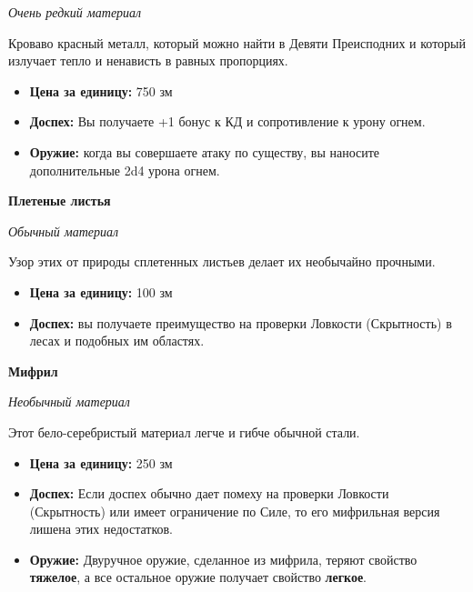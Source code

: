 \documentclass[a4paper, 9pt, twocolumn]{book}
\begin{document}
	\noindent \textit{Очень редкий материал}
	
	\smallskip
	
	\noindent Кроваво красный металл, который можно найти в Девяти Преисподних и который излучает тепло и ненависть в равных пропорциях.
	
	\begin{itemize}
		\item \textbf{Цена за единицу:} 750 зм
		
		\item \textbf{Доспех:} Вы получаете +1 бонус к КД и сопротивление к урону огнем.
		
		\item \textbf{Оружие:} когда вы совершаете атаку по существу, вы наносите дополнительные 2d4 урона огнем.
	\end{itemize}

	\noindent \textbf{Плетеные листья} %
	
	\noindent \textit{Обычный материал}
	
	\smallskip
	
	\noindent Узор этих от природы сплетенных листьев делает их необычайно прочными.
	
	\begin{itemize}
		\item \textbf{Цена за единицу:} 100 зм
		
		\item \textbf{Доспех:} вы получаете преимущество на проверки Ловкости (Скрытность) в лесах и подобных им областях.
	\end{itemize}

	\noindent \textbf{Мифрил}
	
	\noindent \textit{Необычный материал}
	
	\smallskip
	
	\noindent Этот бело-серебристый материал легче и гибче обычной стали.
	
	\begin{itemize}
		\item \textbf{Цена за единицу:} 250 зм
		
		\item \textbf{Доспех:} Если доспех обычно дает помеху на проверки Ловкости (Скрытность) или имеет ограничение по Силе, то его мифрильная версия лишена этих недостатков.
		
		\item \textbf{Оружие:} Двуручное оружие, сделанное из мифрила, теряют свойство \textbf{тяжелое}, а все остальное оружие получает свойство \textbf{легкое}.
	\end{itemize}
\end{document}
